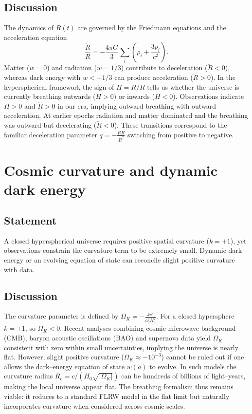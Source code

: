 \documentclass{article}
\begin{document}
\subsection{Discussion}
The dynamics of $R(t)$ are governed by the Friedmann equations and the acceleration equation
\[
\frac{\ddot{R}}{R} = -\frac{4\pi G}{3}\sum_i \left( \rho_i + \frac{3p_i}{c^2} \right).
\]
Matter ($w=0$) and radiation ($w=1/3$) contribute to deceleration ($\ddot{R}<0$), whereas dark energy with $w<-1/3$ can produce acceleration ($\ddot{R}>0$).  In the hyperspherical framework the sign of $H=\dot{R}/R$ tells us whether the universe is currently breathing outwards ($H>0$) or inwards ($H<0$).  Observations indicate $H>0$ and $\ddot{R}>0$ in our era, implying outward breathing with outward acceleration.  At earlier epochs radiation and matter dominated and the breathing was outward but decelerating ($\ddot{R}<0$).  These transitions correspond to the familiar deceleration parameter $q = -\frac{R \ddot{R}}{\dot{R}^2}$ switching from positive to negative.

\section{Cosmic curvature and dynamic dark energy}
\label{sec:curvature}
\subsection{Statement}
A closed hyperspherical universe requires positive spatial curvature ($k=+1$), yet observations constrain the curvature term to be extremely small.  Dynamic dark energy or an evolving equation of state can reconcile slight positive curvature with data.

\subsection{Discussion}
The curvature parameter is defined by $\Omega_K = -\frac{k c^2}{a_0^2 H_0^2}$.  For a closed hypersphere $k=+1$, so $\Omega_K < 0$.  Recent analyses combining cosmic microwave background (CMB), baryon acoustic oscillations (BAO) and supernova data yield $\Omega_K$ consistent with zero within small uncertainties, implying the universe is nearly flat.  However, slight positive curvature ($\Omega_K\approx -10^{-3}$) cannot be ruled out if one allows the dark–energy equation of state $w(a)$ to evolve.  In such models the curvature radius $R_c = c/(H_0\sqrt{|\Omega_K|})$ can be hundreds of billions of light–years, making the local universe appear flat.  The breathing formalism thus remains viable: it reduces to a standard FLRW model in the flat limit but naturally incorporates curvature when considered across cosmic scales.
\end{document}
